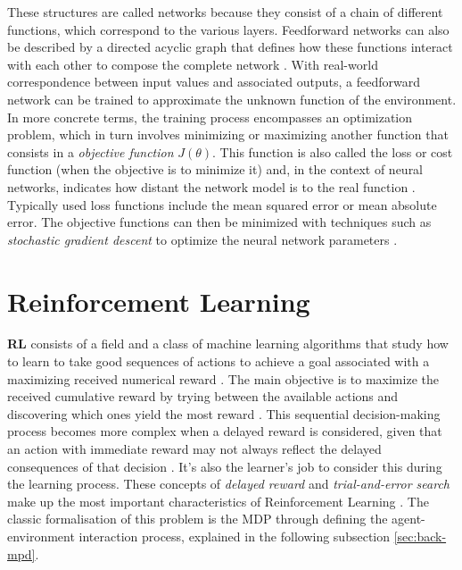 These structures are called networks because they consist of a chain of different functions, which correspond to the various layers. Feedforward networks can also be described by a directed acyclic graph that defines how these functions interact with each other to compose the complete network \cite{ goodfellowDeepLearning2016}. 
With real-world correspondence between input values and associated outputs, a feedforward network can be trained to approximate the unknown function of the environment. In more concrete terms, the training process encompasses an optimization problem,  which in turn involves minimizing or maximizing another function that consists in a \textit{objective function} $J(\theta)$. This function is also called the loss or cost function (when the objective is to minimize it) and, in the context of neural networks, indicates how distant the network model is to the real function \cite{goodfellowDeepLearning2016}. Typically used loss functions include the mean squared error or mean absolute error. The objective functions can then be minimized with techniques such as \textit{stochastic gradient descent} to optimize the neural network parameters \cite{charniakIntroductionDeepLearning2018, goodfellowDeepLearning2016}. 


\section{Reinforcement Learning} \label{sec:back-rl}

\textbf{\acf{RL}} consists of a field and a class of machine learning algorithms that study how to learn to take good sequences of actions to achieve a goal associated with a maximizing received numerical reward \cite{brunskillCS234ReinforcementLearning}. The main objective is to maximize the received cumulative reward by trying between the available actions and discovering which ones yield the most reward \cite{suttonReinforcementLearningIntroduction2014}. This sequential decision-making process becomes more complex when a delayed reward is considered, given that an action with immediate reward may not always reflect the delayed consequences of that decision \cite{suttonReinforcementLearningIntroduction2014}. It's also the learner's job to consider this during the learning process. These concepts of \textit{delayed reward} and \textit{trial-and-error search} make up the most important characteristics of Reinforcement Learning \cite{suttonReinforcementLearningIntroduction2014}. The classic formalisation of this problem is the \ac{MDP} through defining the agent-environment interaction process, explained in the following subsection \ref{sec:back-mpd}. \par 

